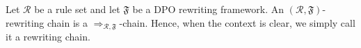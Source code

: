 
\begin{definition}\label{def:rewriting-chain}
Let \(\mathcal{R}\) be a rule set and let \(\mathfrak{F}\) be a DPO rewriting framework.
An \((\mathcal{R},\mathfrak{F})\)-rewriting chain is a \(\Rightarrow_{\mathcal{R},\mathfrak{F}}\)-chain. Hence, when the context is clear, we simply call it a rewriting chain.
\end{definition}

